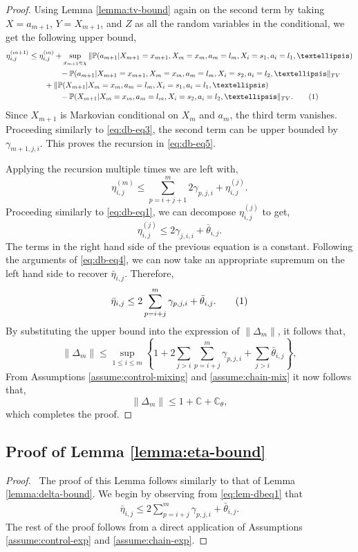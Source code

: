 \documentclass[opre,sglanonrev]{informs4}
\numberwithin{equation}{section}
\newcommand{\pow}[1]{^{(#1)}}
\newcommand{\lc}{\left\{}
\newcommand{\rc}{\right\}}
\newcommand{\Cbb}{\mathbb{C}}
\newcommand{\Pbb}{\mathbb{P}}
\newcommand{\constant}{\Cbb}
\newcommand{\deltam}{\lVert \Delta_m \rVert}
\newcommand\numberthis{\addtocounter{equation}{1}\tag{\theequation}}
\newcommand{\prob}{\Pbb}
\newcommand{\probl}{\prob}
\begin{document}
\begin{APPENDICES}
\begin{proof}
Using Lemma \ref{lemma:tv-bound} again on the second term by taking $X=a_{m+1}$, $Y=X_{m+1}$, and $Z$ as all the random variables in the conditional, we get the following upper bound,
\begin{align*}
    \eta_{i,j}^{(m+1)}& \leq \eta_{i,j}^{(m)} + \sup_{x_{m+1}\in \chi}\|\probl(a_{m+1}|X_{m+1}=x_{m+1},X_{m}=x_{m},a_{m}=l_{m},X_i=s_1,a_i=l_1,\dots)\\
    & \qquad \qquad -\probl(a_{m+1}|X_{m+1}=x_{m+1},X_{m}=x_{m},a_{m}=l_{m},X_i=s_2,a_i=l_2,\dots\|_{TV}\\
    & \qquad + \|\probl(X_{m+1}|X_{m}=x_{m},a_{m}=l_{m},X_i=s_1,a_i=l_1,\dots)\\
    & \qquad \qquad -\probl(X_{m+1}|X_{m}=x_{m},a_{m}=l_{m},X_i=s_2,a_i=l_2,\dots\|_{TV}.\numberthis\label{eq:db-eq2}
\end{align*}
Since $X_{m+1}$ is Markovian conditional on $X_{m}$ and $a_{m}$, the third term vanishes. Proceeding similarly to \cref{eq:db-eq3}, the second term can be upper bounded by $\gamma_{m+1,j,i}$.
This proves the recursion in \cref{eq:db-eq5}.

Applying the recursion multiple times we are left with, 
\[
\eta_{i,j}^{(m)}\leq \sum_{p=i+j+1}^m 2\gamma_{p,j,i}+\eta_{i,j}\pow{j}.
\]
Proceeding similarly to \cref{eq:db-eq1}, we can decompose $\eta_{i,j}\pow{j}$ to get, 
\[
\eta_{i,j}^{(j)}\leq 2\gamma_{j,i,i}+\bar\theta_{i,j}.
\]
The terms in the right hand side of the previous equation is a constant. 
Following the arguments of \cref{eq:db-eq4}, we can now take an appropriate supremum on the left hand side to recover $\bar \eta_{i,j}$. 
Therefore, 
\begin{align*}
     \bar\eta_{i,j}\leq 2\sum_{p=i+j}^m\gamma_{p,j,i}+\bar\theta_{i,j}.\numberthis\label{eq:lem-dbeq1}   
\end{align*}
By substituting the upper bound into the expression of $\deltam$, it follows that, 
\[
    \deltam \leq \sup_{1\leq i\leq m}\lc 1+2\sum_{j>i}\sum_{p=i+j}^m\gamma_{p,j,i}+\sum_{j>i}\bar\theta_{i,j}\rc,
\]
From Assumptions \ref{assume:control-mixing} and \ref{assume:chain-mix} it now follows that,
\[
     \deltam \leq 1+\constant+\constant_{\theta}, 
\]
which completes the proof.
\end{proof}
{
\subsection{Proof of Lemma \ref{lemma:eta-bound}}
\begin{proof}\ 
The proof of this Lemma follows similarly to that of Lemma \ref{lemma:delta-bound}. We begin by observing from \cref{eq:lem-dbeq1} that
\begin{align*}
    \bar\eta_{i,j}\leq 2\sum_{p=i+j}^m\gamma_{p,j,i}+\bar\theta_{i,j}.
\end{align*}
The rest of the proof follows from a direct application of Assumptions \ref{assume:control-exp} and \ref{assume:chain-exp}.
\end{proof}
}

\end{APPENDICES}
\end{document}
